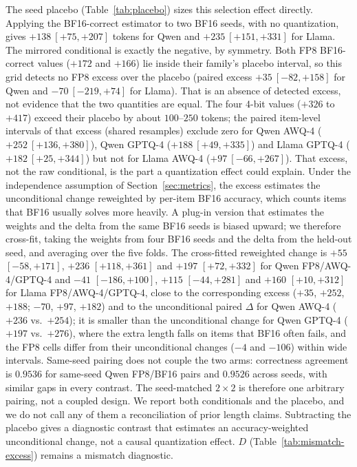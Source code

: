 \documentclass[11pt,a4paper]{article}
\begin{document}
The seed placebo (Table~\ref{tab:placebo}) sizes this selection effect directly. Applying the BF16-correct estimator to two BF16 seeds, with no quantization, gives $+138\ [+75,+207]$ tokens for Qwen and $+235\ [+151,+331]$ for Llama. The mirrored conditional is exactly the negative, by symmetry. Both FP8 BF16-correct values ($+172$ and $+166$) lie inside their family's placebo interval, so this grid detects no FP8 excess over the placebo (paired excess $+35\ [-82,+158]$ for Qwen and $-70\ [-219,+74]$ for Llama). That is an absence of detected excess, not evidence that the two quantities are equal. The four 4-bit values ($+326$ to $+417$) exceed their placebo by about $100$--$250$ tokens; the paired item-level intervals of that excess (shared resamples) exclude zero for Qwen AWQ-4 ($+252\ [+136,+380]$), Qwen GPTQ-4 ($+188\ [+49,+335]$) and Llama GPTQ-4 ($+182\ [+25,+344]$) but not for Llama AWQ-4 ($+97\ [-66,+267]$). That excess, not the raw conditional, is the part a quantization effect could explain. Under the independence assumption of Section~\ref{sec:metrics}, the excess estimates the unconditional change reweighted by per-item BF16 accuracy, which counts items that BF16 usually solves more heavily. A plug-in version that estimates the weights and the delta from the same BF16 seeds is biased upward; we therefore cross-fit, taking the weights from four BF16 seeds and the delta from the held-out seed, and averaging over the five folds. The cross-fitted reweighted change is $+55$ $[-58,+171]$, $+236$ $[+118,+361]$ and $+197$ $[+72,+332]$ for Qwen FP8/AWQ-4/GPTQ-4 and $-41$ $[-186,+100]$, $+115$ $[-44,+281]$ and $+160$ $[+10,+312]$ for Llama FP8/AWQ-4/GPTQ-4, close to the corresponding excess ($+35$, $+252$, $+188$; $-70$, $+97$, $+182$) and to the unconditional paired $\Delta$ for Qwen AWQ-4 ($+236$ vs.\ $+254$); it is smaller than the unconditional change for Qwen GPTQ-4 ($+197$ vs.\ $+276$), where the extra length falls on items that BF16 often fails, and the FP8 cells differ from their unconditional changes ($-4$ and $-106$) within wide intervals. Same-seed pairing does not couple the two arms: correctness agreement is $0.9536$ for same-seed Qwen FP8/BF16 pairs and $0.9526$ across seeds, with similar gaps in every contrast. The seed-matched $2\times 2$ is therefore one arbitrary pairing, not a coupled design. We report both conditionals and the placebo, and we do not call any of them a reconciliation of prior length claims. Subtracting the placebo gives a diagnostic contrast that estimates an accuracy-weighted unconditional change, not a causal quantization effect. $D$ (Table~\ref{tab:mismatch-excess}) remains a mismatch diagnostic.
\end{document}

